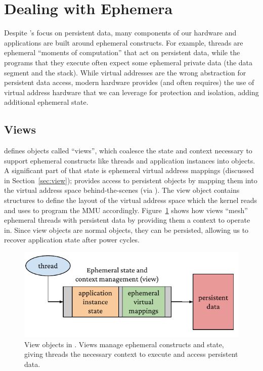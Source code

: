 \section{Dealing with Ephemera}

Despite \Twizzler's focus on persistent data, many components of our hardware and applications are
built around ephemeral constructs. For example, threads are ephemeral ``moments of computation''
that act on persistent data, while the programs that they execute often expect some ephemeral
private data (\eg the data segment and the stack). While virtual addresses are the wrong abstraction
for persistent data access, modern hardware provides (and often requires) the use of virtual address
hardware that we can leverage for protection and isolation, adding additional ephemeral state.

\subsection{Views}
\label{sec:view_impl}

\Twizzler defines objects called ``views'', which coalesce the state
and context necessary to support ephemeral constructs like threads and application instances into
\Twizzler objects. A significant part of that state is ephemeral virtual address mappings (discussed in Section~\ref{sec:view}); \Twizzler
provides access to persistent objects by mapping them into the virtual address space
behind-the-scenes (via \libcore). The view object contains structures to define the layout of the
virtual address space which the kernel reads and uses to program the MMU accordingly. Figure~\ref{fig:view2} shows how
views ``mesh'' ephemeral threads with persistent data by providing them a context to operate in.
Since view objects are normal \Twizzler objects, they can be persisted, allowing
us to recover application state after power cycles.

\begin{figure}
    \centering
    \includegraphics[width=\linewidth]{fig/view2}
    \caption[View objects in Twizzler]{View objects in \Twizzler. Views manage ephemeral constructs and state, giving threads
        the necessary context to execute and access persistent data.}
    \label{fig:view2}
\end{figure}


